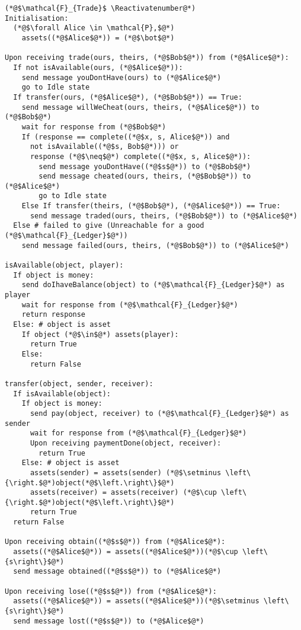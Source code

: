 \Suppressnumber
\begin{lstlisting}[label=tradefunc, style=numbers]
(*@$\mathcal{F}_{Trade}$ \Reactivatenumber@*)
Initialisation:
  (*@$\forall Alice \in \mathcal{P},$@*)
    assets((*@$Alice$@*)) = (*@$\bot$@*)

Upon receiving trade(ours, theirs, (*@$Bob$@*)) from (*@$Alice$@*):
  If not isAvailable(ours, (*@$Alice$@*)):
    send message youDontHave(ours) to (*@$Alice$@*)
    go to Idle state
  If transfer(ours, (*@$Alice$@*), (*@$Bob$@*)) == True:
    send message willWeCheat(ours, theirs, (*@$Alice$@*)) to (*@$Bob$@*)
    wait for response from (*@$Bob$@*)
    If (response == complete((*@$x, s, Alice$@*)) and
      not isAvailable((*@$s, Bob$@*))) or
      response (*@$\neq$@*) complete((*@$x, s, Alice$@*)):
        send message youDontHave((*@$s$@*)) to (*@$Bob$@*)
        send message cheated(ours, theirs, (*@$Bob$@*)) to (*@$Alice$@*)
        go to Idle state
    Else If transfer(theirs, (*@$Bob$@*), (*@$Alice$@*)) == True:
      send message traded(ours, theirs, (*@$Bob$@*)) to (*@$Alice$@*)
  Else # failed to give (Unreachable for a good (*@$\mathcal{F}_{Ledger}$@*))
    send message failed(ours, theirs, (*@$Bob$@*)) to (*@$Alice$@*)

isAvailable(object, player):
  If object is money:
    send doIhaveBalance(object) to (*@$\mathcal{F}_{Ledger}$@*) as player
    wait for response from (*@$\mathcal{F}_{Ledger}$@*)
    return response
  Else: # object is asset
    If object (*@$\in$@*) assets(player):
      return True
    Else:
      return False

transfer(object, sender, receiver):
  If isAvailable(object):
    If object is money:
      send pay(object, receiver) to (*@$\mathcal{F}_{Ledger}$@*) as sender
      wait for response from (*@$\mathcal{F}_{Ledger}$@*)
      Upon receiving paymentDone(object, receiver):
        return True
    Else: # object is asset
      assets(sender) = assets(sender) (*@$\setminus \left\{\right.$@*)object(*@$\left.\right\}$@*)
      assets(receiver) = assets(receiver) (*@$\cup \left\{\right.$@*)object(*@$\left.\right\}$@*)
      return True
  return False

Upon receiving obtain((*@$s$@*)) from (*@$Alice$@*):
  assets((*@$Alice$@*)) = assets((*@$Alice$@*))(*@$\cup \left\{s\right\}$@*)
  send message obtained((*@$s$@*)) to (*@$Alice$@*)

Upon receiving lose((*@$s$@*)) from (*@$Alice$@*):
  assets((*@$Alice$@*)) = assets((*@$Alice$@*))(*@$\setminus \left\{s\right\}$@*)
  send message lost((*@$s$@*)) to (*@$Alice$@*)
\end{lstlisting}
